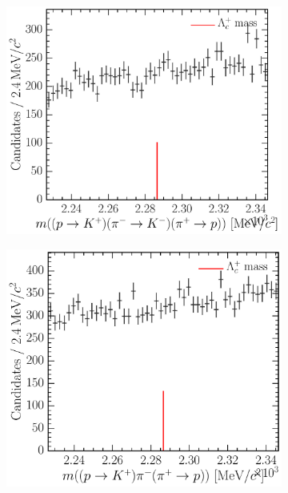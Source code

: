 \begin{figure}
  \begin{subfigure}[b]{0.3\textwidth}
    \includegraphics[width=\textwidth]{figures/cpv/selection/background_study/ppipi/LcToppipi_2012_MagDown_Lc_ppTokp_pimTokm_pipTopp}
    \caption{\decay{\PLambdac}{\PKplus\PKminus\Pproton}}
    \label{fig:cpv:selection:background_study:ppipi_baryon:kkp}
  \end{subfigure}
  \begin{subfigure}[b]{0.3\textwidth}
    \includegraphics[width=\textwidth]{figures/cpv/selection/background_study/ppipi/LcToppipi_2012_MagDown_Lc_ppTokp_pim_pipTopp}

\end{subfigure}
\end{figure}
